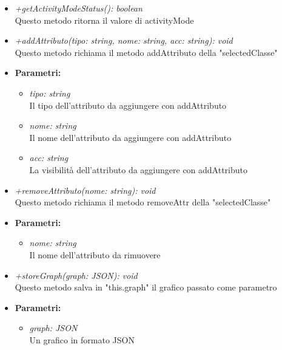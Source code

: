\begin{itemize}
\begin{itemize}
          				\item \emph{+getActivityModeStatus(): boolean}\\
          				Questo metodo ritorna il valore di activityMode
          				\item \emph{+addAttributo(tipo: string, nome: string, acc: string): void}\\
          				Questo metodo richiama il metodo addAttributo della "selectedClasse"
          				\item \textbf{Parametri:}\\
            				\begin{itemize}
            					\item \emph{tipo: string}\\
            					Il tipo dell'attributo da aggiungere con addAttributo
            					\item \emph{nome: string}\\
            					Il nome dell'attributo da aggiungere con addAttributo
            					\item \emph{acc: string}\\
            					La visibilità dell'attributo da aggiungere con addAttributo
            				\end{itemize}
            			\item \emph{+removeAttributo(nome: string): void}\\
          				Questo metodo richiama il metodo removeAttr della "selectedClasse"
          				\item \textbf{Parametri:}\\
            				\begin{itemize}
            					\item \emph{nome: string}\\
            					Il nome dell'attributo da rimuovere
            				\end{itemize}
            			\item \emph{+storeGraph(graph: JSON): void}\\
          				Questo metodo salva in "this.graph" il grafico passato come parametro
          				\item \textbf{Parametri:}\\
            				\begin{itemize}
            					\item \emph{graph: JSON}\\
            					Un grafico in formato JSON
            				\end{itemize}

\end{itemize}
\end{itemize}
